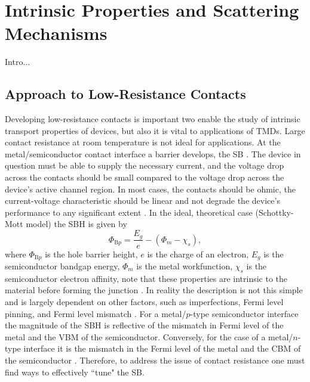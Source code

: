 \chapter{Intrinsic Properties and Scattering Mechanisms}\label{chap:results}
Intro...

\section{Approach to Low-Resistance Contacts}\label{sec:contacts}
Developing low-resistance contacts is important two enable the study of intrinsic transport properties of devices, but also it is vital to applications of \acp{TMD}. Large contact resistance at room temperature is not ideal for applications. At the metal/semiconductor contact interface a barrier develops, the \acs{SB} \cite{Schottky_ZPhys1938}. The device in question must be able to supply the necessary current, and the voltage drop across the contacts should be small compared to the voltage drop across the device's active channel region. In most cases, the contacts should be ohmic, the current-voltage characteristic should be linear and not degrade the device's performance to any significant extent \cite{Rideout_Solid1975}. In the ideal, theoretical case (Schottky-Mott model)  the \acs{SBH} is given by 
\begin{equation}\label{eq:schottky_mott}
	\Phi_{\mathrm{B}p} = \frac{E_g}{e}- \left(\Phi_m - \chi_s\right),
\end{equation}
where $\Phi_{\mathrm{B}p}$ is the hole barrier height, $e$ is the charge of an electron, $E_g$ is the semiconductor bandgap energy, $\Phi_m$ is the metal workfunction, $\chi_s$ is the semiconductor electron affinity, note that these properties are intrinsic to the material before forming the junction \cite{Rhoderick_Book1988}. In reality the description is not this simple and is largely dependent on other factors, such as imperfections, Fermi level pinning, and Fermi level mismatch \cite{Cohen_Book2014}. For a metal/$p$-type semiconductor interface the magnitude of the \acs{SBH} is reflective of the mismatch in Fermi level of the metal and the \ac{VBM} of the semiconductor. Conversely, for the case of a metal/$n$-type interface it is the mismatch in the Fermi level of the metal and the \ac{CBM} of the semiconductor \cite{Tung_AppPhysRev2014}. Therefore, to address the issue of contact resistance one must find ways to effectively ``tune" the \acs{SB}.\\ \\

